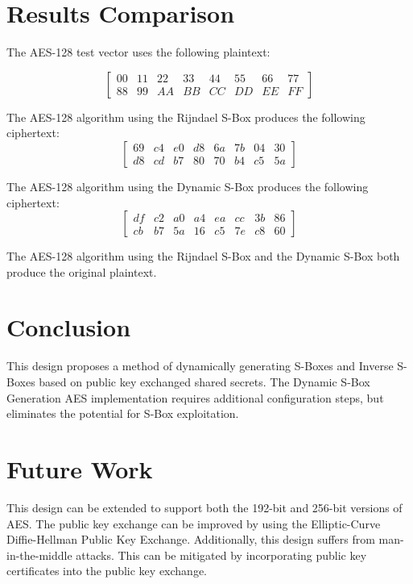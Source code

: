 \documentclass[journal]{IEEEtran}
\begin{document}
\section{Results Comparison}
The AES-128 test vector uses the following plaintext:

$$
\begin{bmatrix}
00 & 11 & 22 & 33 & 44 & 55 & 66 & 77 \\
88 & 99 & AA & BB & CC & DD & EE & FF
\end{bmatrix}
$$

The AES-128 algorithm using the Rijndael S-Box produces the following ciphertext:
$$
\begin{bmatrix}
69 & c4 & e0 & d8 & 6a & 7b & 04 & 30 \\
d8 & cd & b7 & 80 & 70 & b4 & c5 & 5a
\end{bmatrix}
$$

The AES-128 algorithm using the Dynamic S-Box produces the following ciphertext:
$$
\begin{bmatrix}
 df & c2 & a0 & a4 & ea & cc & 3b & 86 \\
cb & b7 & 5a & 16 & c5 & 7e & c8 & 60
\end{bmatrix}
$$

The AES-128 algorithm using the Rijndael S-Box and the Dynamic S-Box both produce the original plaintext.

\section{Conclusion}
This design proposes a method of dynamically generating S-Boxes and Inverse S-Boxes based on public key exchanged shared secrets. The Dynamic S-Box Generation AES implementation requires additional configuration steps, but eliminates the potential for S-Box exploitation.

\section{Future Work}
This design can be extended to support both the 192-bit and 256-bit versions of AES. The public key exchange can be improved by using the Elliptic-Curve Diffie-Hellman Public Key Exchange. Additionally, this design suffers from man-in-the-middle attacks. This can be mitigated by incorporating public key certificates into the public key exchange.

\end{document}

